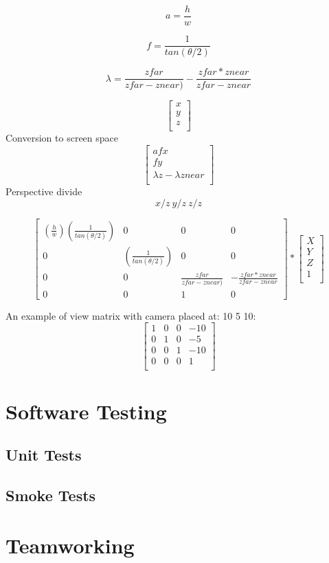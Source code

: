 \[
a=\frac{h}{w}
\]

\[
f=\frac{1}{tan(\theta / 2)}
\]

\[
\lambda=\frac{zfar}{zfar - znear)}
-
\frac{zfar * znear}{zfar-znear}
\]

\[
\begin{bmatrix}
x\\
y\\
z\\
\end{bmatrix}
\]
Conversion to screen space
\[
\begin{bmatrix}
afx\\
fy\\
\lambda z-\lambda znear\\
\end{bmatrix}
\]
Perspective divide
\[
x/z\ y/z\ z/z
\]

\[
\begin{bmatrix}
(\frac{h}{w})(\frac{1}{tan(\theta/2)}) & 0 & 0 & 0\\
0 & (\frac{1}{tan(\theta/2)}) & 0 & 0\\
0 & 0 & \frac{zfar}{zfar - znear)} & -\frac{zfar * znear}{zfar-znear}\\
0 & 0 & 1 & 0
\end{bmatrix} 
*
\begin{bmatrix}
X\\
Y\\
Z\\
1\\
\end{bmatrix} 
\]

An example of view matrix with camera placed at: 10 5 10:
\[
\begin{bmatrix}
1 & 0 & 0 & -10\\
0 & 1 & 0 & -5\\
0 & 0 & 1 & -10\\
0 & 0 & 0 & 1\\
\end{bmatrix} 
\]

\newpage
\section{Software Testing}
\label{sec:testing}
\subsection{Unit Tests} %
\subsection{Smoke Tests}
\newpage
\section{Teamworking}